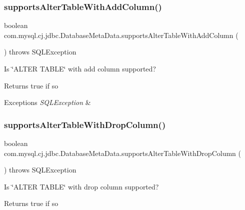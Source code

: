 \subsubsection{\texorpdfstring{supports\+Alter\+Table\+With\+Add\+Column()}{supportsAlterTableWithAddColumn()}}
{\footnotesize\ttfamily boolean com.\+mysql.\+cj.\+jdbc.\+Database\+Meta\+Data.\+supports\+Alter\+Table\+With\+Add\+Column (\begin{DoxyParamCaption}{ }\end{DoxyParamCaption}) throws S\+Q\+L\+Exception}

Is \char`\"{}\+A\+L\+T\+E\+R T\+A\+B\+L\+E\char`\"{} with add column supported?

\begin{DoxyReturn}{Returns}
true if so 
\end{DoxyReturn}

\begin{DoxyExceptions}{Exceptions}
{\em S\+Q\+L\+Exception} & \\
\hline
\end{DoxyExceptions}
\mbox{\label{classcom_1_1mysql_1_1cj_1_1jdbc_1_1_database_meta_data_ab6e5acfa92dcb892a19cae3f54261461}} 
\subsubsection{\texorpdfstring{supports\+Alter\+Table\+With\+Drop\+Column()}{supportsAlterTableWithDropColumn()}}
{\footnotesize\ttfamily boolean com.\+mysql.\+cj.\+jdbc.\+Database\+Meta\+Data.\+supports\+Alter\+Table\+With\+Drop\+Column (\begin{DoxyParamCaption}{ }\end{DoxyParamCaption}) throws S\+Q\+L\+Exception}

Is \char`\"{}\+A\+L\+T\+E\+R T\+A\+B\+L\+E\char`\"{} with drop column supported?

\begin{DoxyReturn}{Returns}
true if so 
\end{DoxyReturn}

